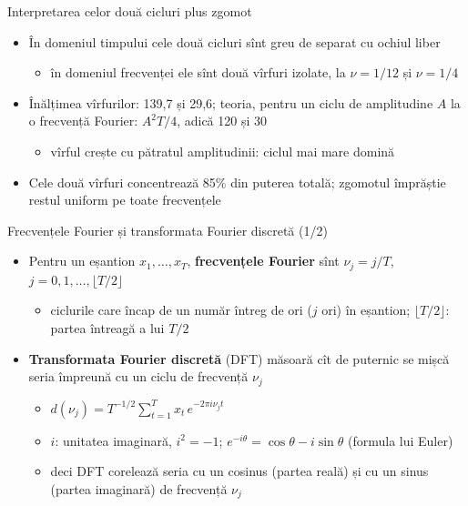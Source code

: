 \begin{frame}{Interpretarea celor două cicluri plus zgomot}
\itemsize{\small}
\begin{itemize}
    \item În domeniul timpului cele două cicluri sînt greu de separat cu ochiul liber
    \begin{itemize}
        \item în domeniul frecvenței ele sînt două vîrfuri izolate, la $\nu = 1/12$ și $\nu = 1/4$
    \end{itemize}
    \item Înălțimea vîrfurilor: 139{,}7 și 29{,}6; teoria, pentru un ciclu de amplitudine $A$ la o frecvență Fourier: $A^2T/4$, adică 120 și 30
    \begin{itemize}
        \item vîrful crește cu pătratul amplitudinii: ciclul mai mare domină
    \end{itemize}
    \item Cele două vîrfuri concentrează 85\% din puterea totală; zgomotul împrăștie restul uniform pe toate frecvențele
\end{itemize}
\end{frame}

\begin{frame}{Frecvențele Fourier și transformata Fourier discretă (1/2)}
\itemsize{\small}
\begin{itemize}
    \item Pentru un eșantion $x_1, \ldots, x_T$, \textbf{frecvențele Fourier} sînt $\nu_j = j/T$, $j = 0, 1, \ldots, \lfloor T/2 \rfloor$
    \begin{itemize}
        \item ciclurile care încap de un număr întreg de ori ($j$ ori) în eșantion; $\lfloor T/2 \rfloor$: partea întreagă a lui $T/2$
    \end{itemize}
    \item \textbf{Transformata Fourier discretă} (DFT) măsoară cît de puternic se mișcă seria împreună cu un ciclu de frecvență $\nu_j$
    \begin{itemize}
        \item $d(\nu_j) = T^{-1/2}\sum_{t=1}^{T} x_t\, e^{-2\pi i \nu_j t}$
        \item $i$: unitatea imaginară, $i^2 = -1$; $e^{-i\theta} = \cos\theta - i\sin\theta$ (formula lui Euler)
        \item deci DFT corelează seria cu un cosinus (partea reală) și cu un sinus (partea imaginară) de frecvență $\nu_j$
    \end{itemize}
\end{itemize}
\end{frame}

